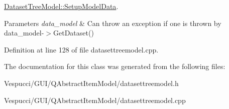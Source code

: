 \hyperlink{class_dataset_tree_model_a6b790c46fce2661df22f977568747799}{Dataset\+Tree\+Model\+::\+Setup\+Model\+Data}. 


\begin{DoxyParams}{Parameters}
{\em data\+\_\+model} & Can throw an exception if one is thrown by data\+\_\+model-\/$>$Get\+Dataset() \\
\hline
\end{DoxyParams}


Definition at line 128 of file datasettreemodel.\+cpp.



The documentation for this class was generated from the following files\+:\begin{DoxyCompactItemize}
\item 
Vespucci/\+G\+U\+I/\+Q\+Abstract\+Item\+Model/datasettreemodel.\+h\item 
Vespucci/\+G\+U\+I/\+Q\+Abstract\+Item\+Model/datasettreemodel.\+cpp\end{DoxyCompactItemize}
